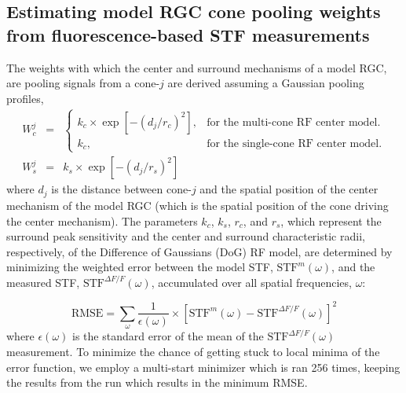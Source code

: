 \documentclass[11pt, oneside]{article}   	%
\begin{document}
\subsection{Estimating model RGC cone pooling weights from fluorescence-based STF measurements}
%
The weights with which the center and surround mechanisms of a model RGC, are pooling signals from a cone-$j$ are derived assuming a Gaussian pooling profiles,
\begin{eqnarray}
W_c^j  & = & \begin{cases}
   k_c \times  \exp \left [ -\left( d_{j}/r_c \right) ^2 \right ], & \text{for the multi-cone RF center model}.\\
   k_c, & \text{for the single-cone RF center model}.
   \end{cases} \\
W_s^j &= &k_s \times \exp \left [ -\left( d_{j}/r_s \right) ^2 \right ]
\end{eqnarray}
\noindent where $d_j$ is the distance between cone-$j$ and the spatial position of the center mechanism of the model RGC (which is the spatial position of the cone driving the center mechanism). The parameters $k_c$, $k_s$, $r_c$, and $r_s$, which represent the surround peak sensitivity and the center and surround characteristic radii, respectively, of the Difference of Gaussians (DoG) RF model, are determined by minimizing the weighted error between the model STF, $\mbox{STF}^{m}(\omega)$, and the measured STF, $\mbox{STF}^{\Delta F / F}(\omega)$, accumulated over all spatial frequencies, $\omega$:

\begin{equation}
\mbox{RMSE} = \displaystyle \sum_{\omega} \frac{1}{\epsilon({\omega})} \times {\left [  \mbox{STF}^{m}(\omega)  - \mbox{STF}^{\Delta F / F}(\omega) \right ] }^2
\end{equation}
where $\epsilon({\omega})$ is the standard error of the mean of the $\mbox{STF}^{\Delta F / F}(\omega)$ measurement. To minimize the chance of getting stuck to local minima of the error function, we employ a multi-start minimizer which is ran 256 times, keeping the results from the run which results in the minimum RMSE.
\end{document}

